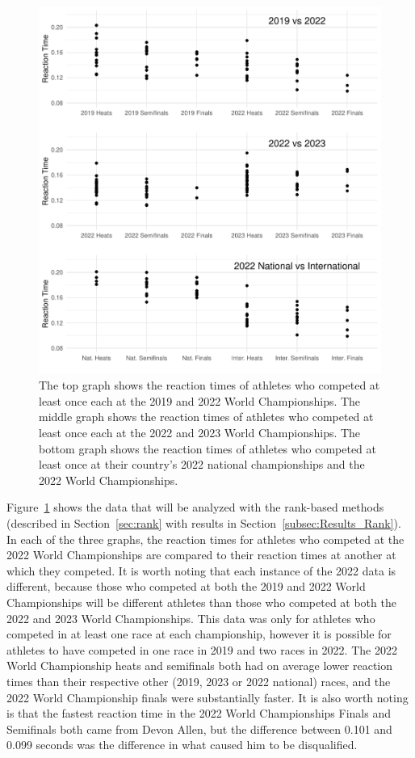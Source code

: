 \documentclass[12pt, letterpaper]{article}
\begin{document}
\begin{figure}[tbp]
  \centering
  \includegraphics{RankScatterPlots}
  \caption{The top graph shows the reaction times of athletes who competed at 
	least once each at the 2019 and 2022 World Championships. The middle graph 
	shows the reaction times of athletes who competed at least once each at the 
	2022 and 2023 World Championships. The bottom graph shows the reaction times 
	of athletes who competed at least once at their country's
        2022 national championships and the 2022 World Championships.}
  \label{fig:RankScatterplots}
\end{figure}


Figure~\ref{fig:RankScatterplots} shows the data that will be analyzed
with the rank-based methods (described in Section~\ref{sec:rank} with results in 
Section~\ref{subsec:Results_Rank}). In each of the three graphs, the reaction 
times for athletes who competed at the 2022 World Championships
are compared to their reaction times at another at which they competed. 
It is worth noting that each instance of the 2022 data is different, because
those who competed at both the 2019 and 2022 World Championships will be
different athletes than those who competed at both the 2022 and 2023 World
Championships. This data was only for athletes who competed
in at least one race at each championship, however it is possible for athletes
to have competed in one race in 2019 and two races in 2022. The 2022 World
Championship heats and semifinals both had on average lower reaction times than
their respective other (2019, 2023 or 2022 national) races, and the 2022 World 
Championship finals were substantially faster.  It
is also worth noting is that the fastest reaction time in the 2022 World
Championships Finals and Semifinals both came from Devon Allen, but the 
difference between 0.101 and 0.099
seconds was the difference in what caused him to be disqualified. 
\end{document}
